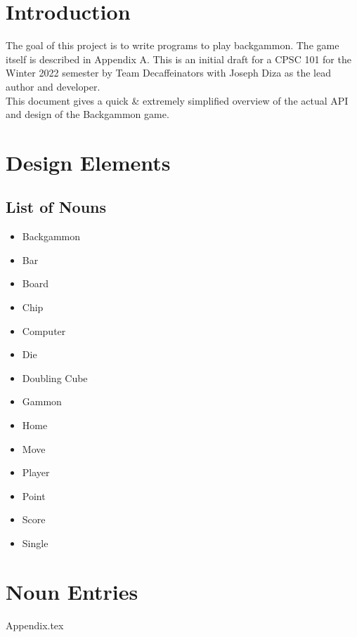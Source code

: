 \documentclass{report}
\begin{document}

\tableofcontents

\chapter{Introduction}

The goal of this project is to write programs to play backgammon. The game
itself is described in Appendix A.
This is an initial draft for a CPSC 101 for the Winter 2022 semester by Team Decaffeinators
with Joseph Diza as the lead author and developer.  \\

\noindent
This document gives a quick \& extremely simplified overview
of the actual API and design of the Backgammon game.



\chapter{Design Elements}

\section{List of Nouns}

\begin{multicols}{2}
    \begin{itemize}
        \item Backgammon
        \item Bar
        \item Board
        \item Chip
        \item Computer
        \item Die
        \item Doubling Cube
    \end{itemize}

    \begin{itemize}
        \item Gammon
        \item Home
        \item Move
        \item Player
        \item Point
        \item Score
        \item Single
    \end{itemize}
\end{multicols}

\chapter{Noun Entries}

















 {Appendix.tex}
\end{document}
